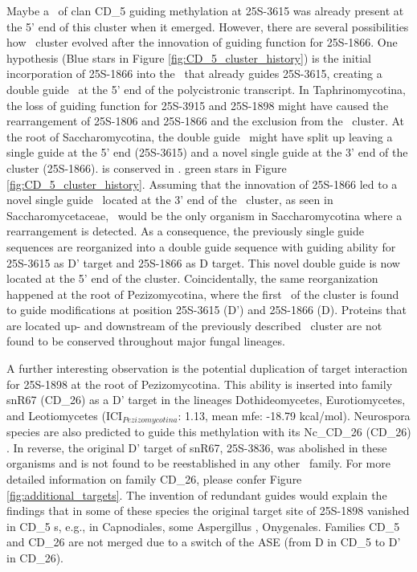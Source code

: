 Maybe a \sno\ of clan CD\_5 guiding methylation at 25S-3615 was already
present at the 5' end of this cluster when it emerged. However, there are
several possibilities how  \sno\ cluster evolved after the
innovation of guiding function for 25S-1866.  One hypothesis (Blue stars in
Figure \ref{fig:CD_5_cluster_history}) is the initial incorporation of
25S-1866 into the \sno\ that already guides 25S-3615, creating a double
guide \sno\ at the 5' end of the polycistronic transcript. In
Taphrinomycotina, the loss of guiding function for 25S-3915 and 25S-1898
might have caused the rearrangement of 25S-1806 and 25S-1866 and the
exclusion from the \sno\ cluster. At the root of Saccharomycotina, the
double guide \sno\ might have split up leaving a single guide at the 5' end
(25S-3615) and a novel single guide at the 3' end of the cluster
(25S-1866).  is conserved
 in \Yli.  green stars in
Figure \ref{fig:CD_5_cluster_history}. Assuming that the innovation of
25S-1866 led to a novel single guide \sno\ located at the 3' end of the
\sno\ cluster, as seen in Saccharomycetaceae, \yli\ would be the only
organism in Saccharomycotina where a rearrangement is detected. As a
consequence, the previously single guide sequences are reorganized into a
double guide sequence with guiding ability for 25S-3615 as D' target and
25S-1866 as D target. This novel double guide is now located at the 5' end
of the cluster.  Coincidentally, the same reorganization happened at the
root of Pezizomycotina, where the first \sno\ of the cluster is found to
guide modifications at position 25S-3615 (D') and 25S-1866 (D). Proteins
that are located up- and downstream of the previously described \sno\
cluster are not found to be conserved throughout major fungal lineages.

A further interesting observation is the potential duplication of target
interaction for 25S-1898 at the root of Pezizomycotina. This ability is
inserted into family snR67 (CD\_26) as a D' target in the lineages
Dothideomycetes, Eurotiomycetes, and Leotiomycetes (ICI$_{Pezizomycotina}$:
1.13, mean mfe: -18.79 kcal/mol). Neurospora species are also predicted to
guide this methylation with its Nc\_CD\_26 (CD\_26) \sno
\cite{Liu:2009}. In reverse, the original D' target of snR67, 25S-3836, was
abolished in these organisms and is not found to be reestablished in any
other \sno\ family. For more detailed information on family CD\_26, please
confer Figure \ref{fig:additional_targets}. The invention of redundant
guides would explain the findings that in some of these species the
original target site of 25S-1898 vanished in CD\_5 \sno s, e.g., in
Capnodiales, some Aspergillus \PFS{species}, \PFS{and} Onygenales. Families
CD\_5 and CD\_26 are not merged due to a switch of the ASE (from D in CD\_5
to D' in CD\_26).

